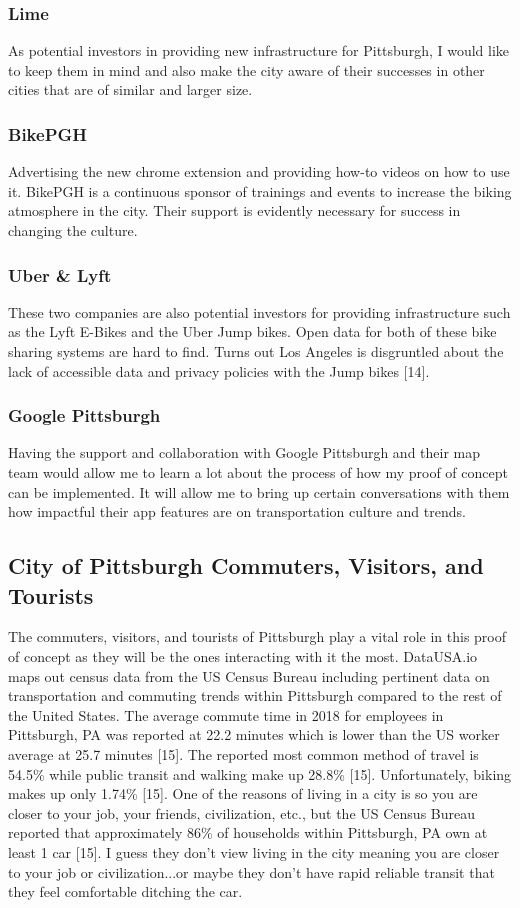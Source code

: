 \documentclass[letterpaper, 12 pt, conference]{ieeeconf}  %
\begin{document}
\subsubsection{Lime}
As potential investors in providing new infrastructure for Pittsburgh, I would like to keep them in mind and also make the city aware of their successes in other cities that are of similar and larger size. 
\subsubsection{BikePGH}
Advertising the new chrome extension and providing how-to videos on how to use it. BikePGH is a continuous sponsor of trainings and events to increase the biking atmosphere in the city. Their support is evidently necessary for success in changing the culture. 
\subsubsection{Uber \& Lyft}
These two companies are also potential investors for providing infrastructure such as the Lyft E-Bikes and the Uber Jump bikes. Open data for both of these bike sharing systems are hard to find. Turns out Los Angeles is disgruntled about the lack of accessible data and privacy policies with the Jump bikes [14].
\subsubsection{Google Pittsburgh}
Having the support and collaboration with Google Pittsburgh and their map team would allow me to learn a lot about the process of how my proof of concept can be implemented. It will allow me to bring up certain conversations with them how impactful their app features are on transportation culture and trends. 

\subsection{City of Pittsburgh Commuters, Visitors, and Tourists}
The commuters, visitors, and tourists of Pittsburgh play a vital role in this proof of concept as they will be the ones interacting with it the most. DataUSA.io maps out census data from the US Census Bureau including pertinent data on transportation and commuting trends within Pittsburgh compared to the rest of the United States. The average commute time in 2018 for employees in Pittsburgh, PA was reported at 22.2 minutes which is lower than the US worker average at 25.7 minutes [15]. The reported most common method of travel is 54.5\% while public transit and walking make up 28.8\% [15]. Unfortunately, biking makes up only 1.74\% [15]. One of the reasons of living in a city is so you are closer to your job, your friends, civilization, etc., but the US Census Bureau reported that approximately 86\% of households within Pittsburgh, PA own at least 1 car [15]. I guess they don't view living in the city meaning you are closer to your job or civilization...or maybe they don't have rapid reliable transit that they feel comfortable ditching the car.  
\newline
\end{document}
